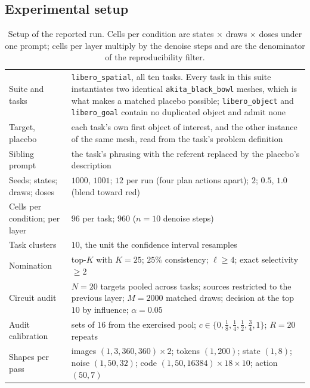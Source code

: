 \subsection{Experimental setup}

\begin{table}[t]
\caption{Setup of the reported run. Cells per condition are states $\times$
draws $\times$ doses under one prompt; cells per layer multiply by the denoise
steps and are the denominator of the reproducibility filter.}
\label{tab:cf-config}
\begin{center}
\small
\begin{tabular}{p{1.35in}p{3.75in}}
\hline
Suite and tasks & \texttt{libero\_spatial}, all ten tasks. Every task in this suite instantiates two identical \texttt{akita\_black\_bowl} meshes, which is what makes a matched placebo possible; \texttt{libero\_object} and \texttt{libero\_goal} contain no duplicated object and admit none \\
Target, placebo & each task's own first object of interest, and the other instance of the same mesh, read from the task's problem definition \\
Sibling prompt & the task's phrasing with the referent replaced by the placebo's description \\
Seeds; states; draws; doses & $1000$, $1001$; $12$ per run (four plan actions apart); $2$; $0.5$, $1.0$ (blend toward red) \\
Cells per condition; per layer & $96$ per task; $960$ ($n=10$ denoise steps) \\
Task clusters & $10$, the unit the confidence interval resamples \\
Nomination & top-$K$ with $K=25$; $25\%$ consistency; $\ell\ge4$; exact selectivity $\ge2$ \\
Circuit audit & $N=20$ targets pooled across tasks; sources restricted to the previous layer; $M=2000$ matched draws; decision at the top $10$ by influence; $\alpha=0.05$ \\
Audit calibration & sets of $16$ from the exercised pool; $c\in\{0,\tfrac18,\tfrac14,\tfrac12,\tfrac34,1\}$; $R=20$ repeats \\
Shapes per pass & images $(1,3,360,360)\times2$; tokens $(1,200)$; state $(1,8)$; noise $(1,50,32)$; code $(1,50,16384)\times18\times10$; action $(50,7)$ \\
\hline
\end{tabular}
\end{center}
\end{table}

